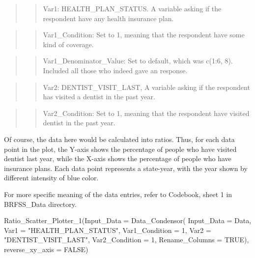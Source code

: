 \documentclass[
]{article}
\newenvironment{Shaded}{\begin{snugshade}}{\end{snugshade}}
\newcommand{\AttributeTok}[1]{\textcolor[rgb]{0.77,0.63,0.00}{#1}}
\newcommand{\ConstantTok}[1]{\textcolor[rgb]{0.00,0.00,0.00}{#1}}
\newcommand{\DecValTok}[1]{\textcolor[rgb]{0.00,0.00,0.81}{#1}}
\newcommand{\FunctionTok}[1]{\textcolor[rgb]{0.00,0.00,0.00}{#1}}
\newcommand{\NormalTok}[1]{#1}
\newcommand{\StringTok}[1]{\textcolor[rgb]{0.31,0.60,0.02}{#1}}
\begin{document}
\begin{quote}
\begin{quote}
Var1: HEALTH\_PLAN\_STATUS. A variable asking if the respondent have any
health insurance plan.
\end{quote}
\end{quote}

\begin{quote}
\begin{quote}
Var1\_Condition: Set to 1, meaning that the respondent have some kind of
coverage.
\end{quote}
\end{quote}

\begin{quote}
\begin{quote}
Var1\_Denominator\_Value: Set to default, which was c(1:6, 8). Included
all those who indeed gave an response.
\end{quote}
\end{quote}

\begin{quote}
\begin{quote}
Var2: DENTIST\_VISIT\_LAST, A variable asking if the respondent has
visited a dentist in the past year.
\end{quote}
\end{quote}

\begin{quote}
\begin{quote}
Var2\_Condition: Set to 1, meaning that the respondent have visited
dentist in the past year.
\end{quote}
\end{quote}

Of course, the data here would be calculated into ratios. Thus, for each
data point in the plot, the Y-axis shows the percentage of people who
have visited dentist last year, while the X-axis shows the percentage of
people who have insurance plans. Each data point represents a
state-year, with the year shown by different intensity of blue color.

For more specific meaning of the data entries, refer to Codebook, sheet
1 in BRFSS\_Data directory.

\begin{Shaded}
\begin{Highlighting}[]
\FunctionTok{Ratio\_Scatter\_Plotter\_1}\NormalTok{(}\AttributeTok{Input\_Data =} \FunctionTok{Data\_Condensor}\NormalTok{(}
  \AttributeTok{Input\_Data =}\NormalTok{ Data, }\AttributeTok{Var1 =} \StringTok{"HEALTH\_PLAN\_STATUS"}\NormalTok{, }
  \AttributeTok{Var1\_Condition =} \DecValTok{1}\NormalTok{, }
  \AttributeTok{Var2 =} \StringTok{"DENTIST\_VISIT\_LAST"}\NormalTok{, }
  \AttributeTok{Var2\_Condition =} \DecValTok{1}\NormalTok{, }\AttributeTok{Rename\_Columns =} \ConstantTok{TRUE}\NormalTok{),}
  \AttributeTok{reverse\_xy\_axis =} \ConstantTok{FALSE}\NormalTok{)}
\end{Highlighting}
\end{Shaded}
\end{document}
